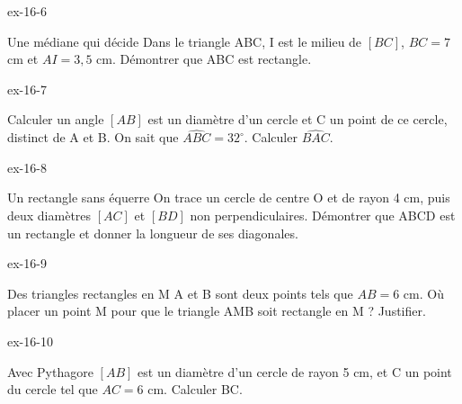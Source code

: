 \begin{blocLivre}{ex-16-6}\begin{exercice}[2]{Une médiane qui décide}
Dans le triangle ABC, I est le milieu de $[BC]$, $BC=7$ cm et $AI=3{,}5$ cm. Démontrer que ABC est rectangle.
\label{fig-ex-16-6}
\end{exercice}\end{blocLivre}
\begin{blocLivre}{ex-16-7}\begin{exercice}[2]{Calculer un angle}
$[AB]$ est un diamètre d’un cercle et C un point de ce cercle, distinct de A et B. On sait que $\widehat{ABC}=32^\circ$. Calculer $\widehat{BAC}$.
\label{fig-ex-16-7}
\end{exercice}\end{blocLivre}
\begin{blocLivre}{ex-16-8}\begin{exercice}[2]{Un rectangle sans équerre}
On trace un cercle de centre O et de rayon 4 cm, puis deux diamètres $[AC]$ et $[BD]$ non perpendiculaires. Démontrer que ABCD est un rectangle et donner la longueur de ses diagonales.
\label{fig-ex-16-8}
\end{exercice}\end{blocLivre}
\begin{blocLivre}{ex-16-9}\begin{exercice}[2]{Des triangles rectangles en M}
A et B sont deux points tels que $AB=6$ cm. Où placer un point M pour que le triangle AMB soit rectangle en M ? Justifier.
\label{fig-ex-16-9}
\end{exercice}\end{blocLivre}
\begin{blocLivre}{ex-16-10}\begin{exercice}[2]{Avec Pythagore}
$[AB]$ est un diamètre d’un cercle de rayon 5 cm, et C un point du cercle tel que $AC=6$ cm. Calculer BC.
\label{fig-ex-16-10}
\end{exercice}\end{blocLivre}

